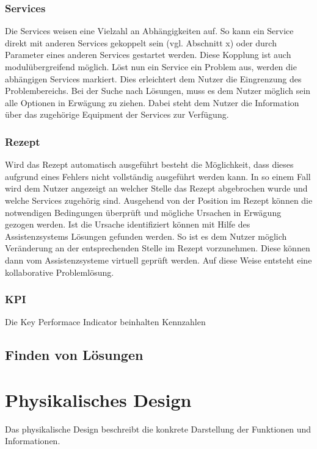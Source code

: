 \subsubsection*{Services}
Die Services weisen eine Vielzahl an Abhängigkeiten auf. So kann ein Service direkt mit anderen Services gekoppelt sein (vgl. Abschnitt x) oder durch Parameter eines anderen Services gestartet werden. Diese Kopplung ist auch modulübergreifend möglich. Löst nun ein Service ein Problem aus, werden die abhängigen Services markiert. Dies erleichtert dem Nutzer die Eingrenzung des Problembereichs. Bei der Suche nach Lösungen, muss es dem Nutzer möglich sein alle Optionen in Erwägung zu ziehen. Dabei steht dem Nutzer die Information über das zugehörige Equipment der Services zur Verfügung.

\subsubsection*{Rezept}
Wird das Rezept automatisch ausgeführt besteht die Möglichkeit, dass dieses aufgrund eines Fehlers nicht vollständig ausgeführt werden kann. In so einem Fall wird dem Nutzer angezeigt an welcher Stelle das Rezept abgebrochen wurde und welche Services zugehörig sind. Ausgehend von der Position im Rezept können die notwendigen Bedingungen überprüft und mögliche Ursachen in Erwägung gezogen werden. Ist die Ursache identifiziert können mit Hilfe des Assistenzsystems Lösungen gefunden werden. So ist es dem Nutzer möglich Veränderung an der entsprechenden Stelle im Rezept vorzunehmen. Diese können dann vom Assistenzsysteme virtuell geprüft werden. Auf diese Weise entsteht eine kollaborative Problemlösung.

\subsubsection*{KPI}
Die Key Performace Indicator beinhalten Kennzahlen 

\subsection{Finden von Lösungen}


\section{Physikalisches Design}
Das physikalische Design beschreibt die konkrete Darstellung der Funktionen und Informationen.

